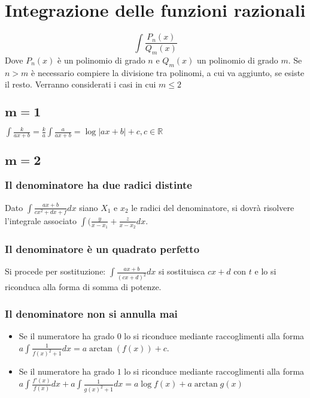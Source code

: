 \section{Integrazione delle funzioni razionali}
\begin{equation}
\int\dfrac{P_n(x)}{Q_m(x)}
\end{equation}
Dove $P_n(x)$ \`e un polinomio di grado $n$ e $Q_m(x)$ un polinomio di grado $m$. Se $n>m$ \`e necessario compiere la divisione tra polinomi, a cui va aggiunto, se esiste il resto. Verranno considerati i casi in cui $m\le 2$
\subsection{$\mathbf{m=1}$}
$\int\frac{k}{ax+b}=\frac{k}{a}\int\frac{a}{ax+b}=\log|ax+b|+c,c\in\mathbb{R}$
\subsection{$\mathbf{m=2}$}
\subsubsection{Il denominatore ha due radici distinte}
Dato $\int\frac{ax+b}{cx^2+dx+f}dx$ siano $X_1$ e $x_2$ le radici del denominatore, si dovr\`a risolvere l'integrale associato $\int(\frac{y}{x-x_1}+\frac{z}{x-x_2}dx$.
\subsubsection{Il denominatore \`e un quadrato perfetto}
Si procede per sostituzione: $\int\frac{ax+b}{(cx+d)^2}dx$ si sostituisca $cx+d$ con $t$ e lo si riconduca alla forma di somma di potenze.
\subsubsection{Il denominatore non si annulla mai}
\begin{itemize}
\item Se il numeratore ha grado $0$ lo si riconduce mediante raccoglimenti alla forma $a\int \frac{1}{f(x)^2+1}dx=a\arctan(f(x))+c$.
\item Se il numeratore ha grado $1$ lo si riconduce mediante raccoglimenti alla forma $a\int\frac{f'(x)}{f(x)}dx+a\int\frac{1}{g(x)^2+1}dx=a\log f(x)+a\arctan g(x)$
\end{itemize}
